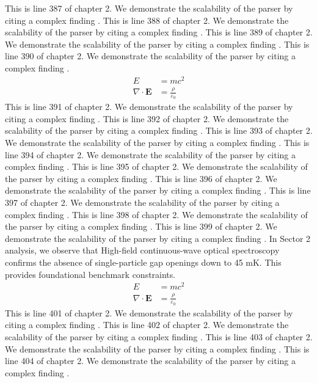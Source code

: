 This is line 387 of chapter 2. We demonstrate the scalability of the parser by citing a complex finding \cite{ref2_387}.
This is line 388 of chapter 2. We demonstrate the scalability of the parser by citing a complex finding \cite{ref2_388}.
This is line 389 of chapter 2. We demonstrate the scalability of the parser by citing a complex finding \cite{ref2_389}.
This is line 390 of chapter 2. We demonstrate the scalability of the parser by citing a complex finding \cite{ref2_390}.
\begin{align*}
  E &= mc^2 \\
  \nabla \cdot \mathbf{E} &= \frac{\rho}{\varepsilon_0}
\end{align*}
This is line 391 of chapter 2. We demonstrate the scalability of the parser by citing a complex finding \cite{ref2_391}.
This is line 392 of chapter 2. We demonstrate the scalability of the parser by citing a complex finding \cite{ref2_392}.
This is line 393 of chapter 2. We demonstrate the scalability of the parser by citing a complex finding \cite{ref2_393}.
This is line 394 of chapter 2. We demonstrate the scalability of the parser by citing a complex finding \cite{ref2_394}.
This is line 395 of chapter 2. We demonstrate the scalability of the parser by citing a complex finding \cite{ref2_395}.
This is line 396 of chapter 2. We demonstrate the scalability of the parser by citing a complex finding \cite{ref2_396}.
This is line 397 of chapter 2. We demonstrate the scalability of the parser by citing a complex finding \cite{ref2_397}.
This is line 398 of chapter 2. We demonstrate the scalability of the parser by citing a complex finding \cite{ref2_398}.
This is line 399 of chapter 2. We demonstrate the scalability of the parser by citing a complex finding \cite{ref2_399}.
In Sector 2 analysis, we observe that High-field continuous-wave optical spectroscopy confirms the absence of single-particle gap openings down to 45 mK. This provides foundational benchmark constraints.
\begin{align*}
  E &= mc^2 \\
  \nabla \cdot \mathbf{E} &= \frac{\rho}{\varepsilon_0}
\end{align*}
This is line 401 of chapter 2. We demonstrate the scalability of the parser by citing a complex finding \cite{ref2_401}.
This is line 402 of chapter 2. We demonstrate the scalability of the parser by citing a complex finding \cite{ref2_402}.
This is line 403 of chapter 2. We demonstrate the scalability of the parser by citing a complex finding \cite{ref2_403}.
This is line 404 of chapter 2. We demonstrate the scalability of the parser by citing a complex finding \cite{ref2_404}.

